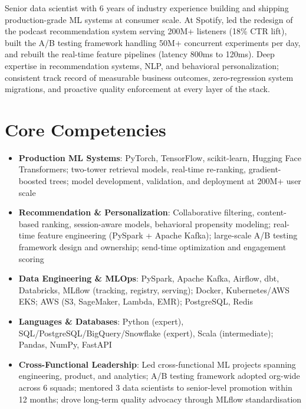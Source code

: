 \documentclass[11pt,a4paper,sans]{moderncv}
\begin{document}
\makecvtitle


\vspace{6pt}
\small{Senior data scientist with 6 years of industry experience building and shipping production-grade ML systems at consumer scale. At Spotify, led the redesign of the podcast recommendation system serving 200M+ listeners (18\% CTR lift), built the A/B testing framework handling 50M+ concurrent experiments per day, and rebuilt the real-time feature pipelines (latency 800ms to 120ms). Deep expertise in recommendation systems, NLP, and behavioral personalization; consistent track record of measurable business outcomes, zero-regression system migrations, and proactive quality enforcement at every layer of the stack.}


\section{Core Competencies}
\vspace{1pt}
\begin{itemize}

\item \textbf{Production ML Systems}: PyTorch, TensorFlow, scikit-learn, Hugging Face Transformers; two-tower retrieval models, real-time re-ranking, gradient-boosted trees; model development, validation, and deployment at 200M+ user scale

\item \textbf{Recommendation \& Personalization}: Collaborative filtering, content-based ranking, session-aware models, behavioral propensity modeling; real-time feature engineering (PySpark + Apache Kafka); large-scale A/B testing framework design and ownership; send-time optimization and engagement scoring

\item \textbf{Data Engineering \& MLOps}: PySpark, Apache Kafka, Airflow, dbt, Databricks, MLflow (tracking, registry, serving); Docker, Kubernetes/AWS EKS; AWS (S3, SageMaker, Lambda, EMR); PostgreSQL, Redis

\item \textbf{Languages \& Databases}: Python (expert), SQL/PostgreSQL/BigQuery/Snowflake (expert), Scala (intermediate); Pandas, NumPy, FastAPI

\item \textbf{Cross-Functional Leadership}: Led cross-functional ML projects spanning engineering, product, and analytics; A/B testing framework adopted org-wide across 6 squads; mentored 3 data scientists to senior-level promotion within 12 months; drove long-term quality advocacy through MLflow standardisation

\end{itemize}
\end{document}
